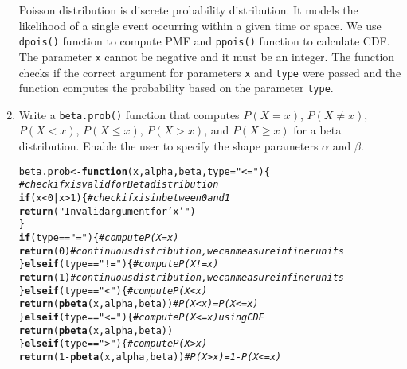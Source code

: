 \documentclass{article}\usepackage[]{graphicx}\usepackage[]{xcolor}
\makeatletter
\newcommand{\hlnum}[1]{\textcolor[rgb]{0.686,0.059,0.569}{#1}}%
\newcommand{\hlsng}[1]{\textcolor[rgb]{0.192,0.494,0.8}{#1}}%
\newcommand{\hlcom}[1]{\textcolor[rgb]{0.678,0.584,0.686}{\textit{#1}}}%
\newcommand{\hlopt}[1]{\textcolor[rgb]{0,0,0}{#1}}%
\newcommand{\hldef}[1]{\textcolor[rgb]{0.345,0.345,0.345}{#1}}%
\newcommand{\hlkwa}[1]{\textcolor[rgb]{0.161,0.373,0.58}{\textbf{#1}}}%
\newcommand{\hlkwb}[1]{\textcolor[rgb]{0.69,0.353,0.396}{#1}}%
\newcommand{\hlkwc}[1]{\textcolor[rgb]{0.333,0.667,0.333}{#1}}%
\newcommand{\hlkwd}[1]{\textcolor[rgb]{0.737,0.353,0.396}{\textbf{#1}}}%
\newenvironment{kframe}{%
 \def\at@end@of@kframe{}%
 \ifinner\ifhmode%
  \def\at@end@of@kframe{\end{minipage}}%
  \begin{minipage}{\columnwidth}%
 \fi\fi%
 \def\FrameCommand##1{\hskip\@totalleftmargin \hskip-\fboxsep
 \colorbox{shadecolor}{##1}\hskip-\fboxsep
     \hskip-\linewidth \hskip-\@totalleftmargin \hskip\columnwidth}%
 \MakeFramed {\advance\hsize-\width
   \@totalleftmargin\z@ \linewidth\hsize
   \@setminipage}}%
 {\par\unskip\endMakeFramed%
 \at@end@of@kframe}
\newenvironment{knitrout}{}{} %
\makeatother
\begin{document}
\begin{enumerate}
\begin{knitrout}
\end{knitrout}
Poisson distribution is discrete probability distribution. It models the likelihood of a single event occurring within a given time or space. We use \texttt{dpois()} function to compute PMF and \texttt{ppois()} function to calculate CDF. The parameter \texttt{x} cannot be negative and it must be an integer. The function checks if the correct argument for parameters \texttt{x} and \texttt{type} were passed and the function computes the probability based on the parameter \texttt{type}. 
    \item Write a \texttt{beta.prob()} function that computes $P(X=x)$, 
    $P(X \neq x)$, $P(X<x)$, $P(X \leq x)$, $P(X > x)$, and $P(X \geq x)$
    for a beta distribution. Enable the user to specify the shape parameters
    $\alpha$ and $\beta$.
\begin{knitrout}\scriptsize
{}\color{fgcolor}\begin{kframe}
\begin{alltt}
\hldef{beta.prob} \hlkwb{<-} \hlkwa{function}\hldef{(}\hlkwc{x}\hldef{,} \hlkwc{alpha}\hldef{,} \hlkwc{beta}\hldef{,} \hlkwc{type}\hldef{=}\hlsng{"<="}\hldef{)\{}
  \hlcom{#check if x is valid for Beta distribution}
  \hlkwa{if} \hldef{(x}\hlopt{<}\hlnum{0} \hlopt{|} \hldef{x}\hlopt{>}\hlnum{1}\hldef{)\{} \hlcom{#check if x is in between 0 and 1}
    \hlkwd{return}\hldef{(}\hlsng{"Invalid argument for 'x'"}\hldef{)}
  \hldef{\}}
  \hlkwa{if} \hldef{(type} \hlopt{==} \hlsng{"="}\hldef{)\{} \hlcom{#compute P(X=x)}
    \hlkwd{return}\hldef{(}\hlnum{0}\hldef{)} \hlcom{#continuous distribution, we can measure in finer units}
  \hldef{\}}\hlkwa{else if}\hldef{(type} \hlopt{==} \hlsng{"!="}\hldef{)\{}  \hlcom{#compute P(X!=x)}
    \hlkwd{return}\hldef{(}\hlnum{1}\hldef{)} \hlcom{#continuous distribution, we can measure in finer units}
  \hldef{\}}\hlkwa{else if}\hldef{(type} \hlopt{==} \hlsng{"<"}\hldef{)\{}  \hlcom{#compute P(X<x)}
    \hlkwd{return}\hldef{(}\hlkwd{pbeta}\hldef{(x, alpha, beta))} \hlcom{#P(X<x) = P(X<=x)}
  \hldef{\}}\hlkwa{else if}\hldef{(type} \hlopt{==} \hlsng{"<="}\hldef{)\{} \hlcom{#compute P(X<=x) using CDF}
    \hlkwd{return}\hldef{(}\hlkwd{pbeta}\hldef{(x, alpha, beta))}
  \hldef{\}}\hlkwa{else if}\hldef{(type} \hlopt{==} \hlsng{">"}\hldef{)\{}  \hlcom{#compute P(X>x)}
    \hlkwd{return}\hldef{(}\hlnum{1} \hlopt{-} \hlkwd{pbeta}\hldef{(x, alpha, beta))} \hlcom{#P(X>x) = 1 - P(X<=x)}

\end{alltt}
\end{kframe}
\end{knitrout}
\end{enumerate}
\end{document}
